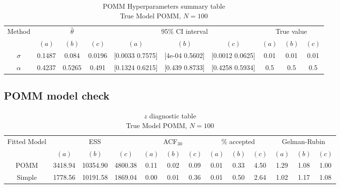 \documentclass[11pt]{amsart}
\begin{document}
\begin{table}[htbp]
\centering
\caption{
{\large POMM Hyperparameters summary table} \\ 
{\small True Model POMM, $N=100$}
} 
\begin{tabular}{cccccccccc}
\toprule
\multirow{2}{*}{Method} & \multicolumn{3}{c}{
$\hat{\theta}$} & \multicolumn{3}{c}{
95$\%$ CI interval} & \multicolumn{3}{c}{True value} \\
\cmidrule(lr){2-4} \cmidrule(lr){5-7} \cmidrule(lr){8-10}
& $(a)$ & $(b)$ & $(c)$ & $(a)$ & $(b)$ & $(c)$ & $(a)$ & $(b)$ & $(c)$ \\
\midrule
$\sigma$ &0.1487 & 0.084 & 0.0196 & [0.0033	0.7575] & [4e-04	0.5602] & [0.0012	0.0625] & 0.01 & 0.01 & 0.01   \\
$\alpha$ & 0.4237 & 0.5265 & 0.491 & [0.1324	0.6215] & [0.439	0.8733] & [0.4258	0.5934] & 0.5 & 0.5 & 0.5 \\
\bottomrule
\end{tabular}
\label{table:hyper_summary_POMM}
\end{table}


\subsection{POMM model check}



\begin{table}[htbp]
\centering
\caption*{
{\large $z$ diagnostic table} \\ 
{\small True Model POMM, $N=100$}
} 
\begin{tabular}{ccccccccccccc}
\toprule
\multirow{2}{*}{Fitted Model} & \multicolumn{3}{c}{ESS} & \multicolumn{3}{c}{
ACF$_{30}$} & \multicolumn{3}{c}{$\%$ accepted} & \multicolumn{3}{c}{Gelman-Rubin}\\
\cmidrule(lr){2-4} \cmidrule(lr){5-7} \cmidrule(lr){8-10} \cmidrule(lr){11-13} 
& $(a)$ & $(b)$ & $(c)$ & $(a)$ & $(b)$ & $(c)$ & $(a)$ & $(b)$ & $(c)$ & $(a)$ & $(b)$ & $(c)$ \\
\midrule
POMM &3418.94 & 10354.90 & 4800.38 & 0.11 & 0.02 & 0.09 & 0.01 & 0.33 & 4.50 &  1.29 & 1.08 & 1.00    \\
Simple &1778.56 & 10191.58 & 1869.04 & 0.00 & 0.01 & 0.36 & 0.01 & 0.50 & 2.64 & 1.02 & 1.17 & 1.08 \\
\bottomrule
\end{tabular}
\label{table:z_diagnostic_POMM}
\end{table}
\end{document}
